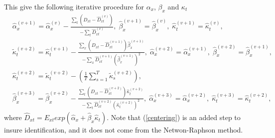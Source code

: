 \documentclass[]{article}
\begin{document}
This give the following iterative procedure for $\alpha_x$, $\beta_x$ and $\kappa_t$
\begin{align}
&\hat{\alpha}_x^{(v+1)}=\hat{\alpha}_x^{(v)}-\frac{\sum_t (D_{xt}-\hat{D}_{xt}^{(v)})}{-\sum_t\hat{D}_{xt}^{(v)}},\;\hat{\beta}_x^{(v+1)}=\hat{\beta}_x^{(v)},\;\hat{\kappa}_t^{(v+1)}=\hat{\kappa}_t^{(v)},\\
&\tilde{\kappa}_t^{(v+2)}=\hat{\kappa}_t^{(v+1)}-\frac{\sum_x(D_{xt}-\hat{D}_{xt}^{(v+1)})\hat{\beta}_x^{(v+1)}}{-\sum_x\hat{D}_{xt}^{(v+1)}(\hat{\beta}_x^{(v+1)})^2},\;\hat{\alpha}_x^{(v+2)}=\hat{\alpha}_x^{(v+1)},\;\hat{\beta}_x^{(v+2)}=\hat{\beta}_x^{(v+1)},\\ \label{centering}
&\hat{\kappa}_t^{(v+2)}=\tilde{\kappa}_t^{(v+2)}-(\frac{1}{T}\sum_{s=1}^{T}\tilde{\kappa}_s^{(v+2)}),\\
&\hat{\beta}_x^{(v+3)}=\hat{\beta}_x^{(v+2)}-\frac{\sum_t (D_{xt}-\hat{D}_{xt}^{(v+2)})\hat{\kappa}_t^{(v+2)}}{-\sum_t\hat{D}_{xt}^{(v+2)}(\hat{\kappa}_t^{(v+2)})^2},\;\hat{\alpha}_x^{(v+3)}=\hat{\alpha}_x^{(v+2)},\;\hat{\kappa}_t^{(v+3)}=\hat{\kappa}_t^{(v+2)},
\end{align}
where $\hat{D}_{xt}=E_{xt}exp(\hat{\alpha}_x+\hat{\beta}_x\hat{\kappa}_t)$. Note that (\ref{centering}) is an added step to insure identification, and it does not come from the Netwon-Raphson method.
\end{document}
